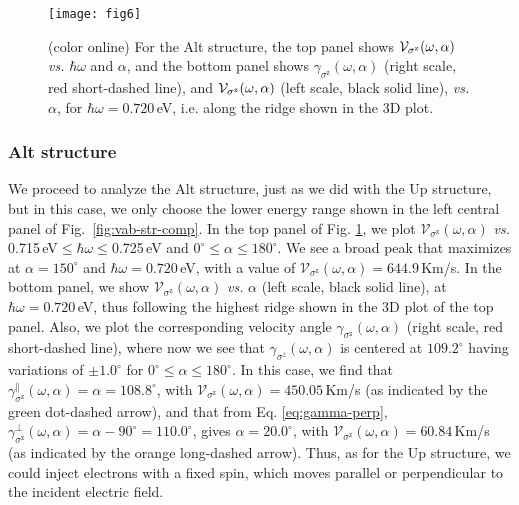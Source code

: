 \documentclass[floatfix,prb,aps,superscriptaddress,showpacs,11pt,preprint,letterpaper]{revtex4}
\def\tama{10cm}
\begin{document}
\begin{figure}[tb]
\centering
\texttt{[image: fig6]}
\caption{(color online) For the Alt structure, the top panel
shows ${\cal V}_{\sigma^\mathrm{z}} (\omega,\alpha)$ {\it vs.} $\hbar\omega$
and $\alpha$, and the bottom panel shows $\gamma_{\sigma^\mathrm{z}}
(\omega,\alpha)$ (right scale, red short-dashed  line), and ${\cal V}_{\sigma^\mathrm{z}}
(\omega,\alpha)$ (left scale, black solid line), {\it vs.} $\alpha$, for
$\hbar\omega=0.720$\,eV, i.e. along the ridge shown in the 3D plot.}
\label{fig:alt-vsz}
\end{figure}

\subsubsection{Alt structure}

We proceed to analyze the Alt structure, just as we did with the Up structure,
but in this case, we only choose the lower energy range shown in the left
central panel of Fig.~\ref{fig:vab-str-comp}. In the top panel of Fig. 
\ref{fig:alt-vsz}, we plot $\mathcal{V}_{\sigma^{\mathrm{z}}} (\omega,\alpha)$
{\it vs.} 0.715\,eV$\leq\hbar\omega\leq$0.725\,eV and $0^\circ\leq\alpha\leq
180^\circ$. We see a broad peak that maximizes at $\alpha=150^{\circ}$ and
$\hbar\omega= 0.720$\,eV, with a value of
$\mathcal{V}_{\sigma^{\mathrm{z}}}(\omega,\alpha) = 644.9$\,Km/s. In the bottom
panel, we  show $\mathcal{V}_{\sigma^{\mathrm{z}}} (\omega,\alpha)$ {\it vs.}
$\alpha$ (left scale, black solid line), at $\hbar\omega= 0.720$\,eV, thus following
the highest ridge shown in the 3D plot of the top panel. Also, we plot the
corresponding velocity angle $\gamma_{\sigma^\mathrm{z}} (\omega,\alpha)$
(right scale, red short-dashed  line), where now we see that
$\gamma_{\sigma^z}(\omega,\alpha)$ is centered at $109.2^{\circ}$ having
variations of $\pm 1.0^{\circ}$ for $0^{\circ} \leq
\alpha \leq 180^{\circ}$. In this case, we find that
$\gamma^\parallel_{\sigma^\mathrm{z}} (\omega,\alpha) =
\alpha = 108.8^\circ$, with $\mathcal{V}_{\sigma^{\mathrm{z}}} (\omega,\alpha)
= 450.05$\,Km/s (as indicated by the  green dot-dashed arrow), 
and that from Eq. \eqref{eq:gamma-perp},
$\gamma^\perp_{\sigma^\mathrm{z}}(\omega,\alpha)=\alpha-90^\circ=110.0^\circ$,
gives $\alpha=20.0^\circ$, with $\mathcal{V}_{\sigma^{\mathrm{z}}}
(\omega,\alpha) = 60.84$\,Km/s 
(as indicated by the orange long-dashed  arrow). Thus, as for the Up structure,
we could inject electrons with a fixed spin, which moves parallel or
perpendicular to the incident electric field.
\end{document}
